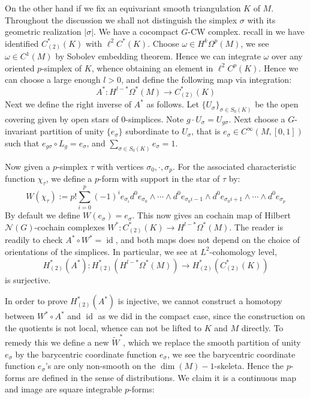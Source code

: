 \documentclass[11pt]{report}
\theoremstyle{definition}
\theoremstyle{plain}
\DeclareMathOperator{\id}{id}
\newcommand{\vna}{\mathcal{N}}
\renewcommand{\tilde}{\widetilde}
\begin{document}
On the other hand if we fix an equivariant smooth triangulation $K$ of $M$. Throughout the discussion we shall not distinguish the simplex $\sigma$ with its geometric realization $|\sigma|$. We have a cocompact $G$-CW complex. recall in  we have identified $C^*_{(2)}(K)$ with $\ell^2C^*(K)$. Choose $\omega\in H^k\Omega^p(M)$, we see $\omega\in C^1(M)$ by Sobolev embedding theorem. Hence we can integrate $\omega$ over any oriented $p$-simplex of $K$, whence obtaining an element in $\ell^2C^p(K)$. Hence we can choose a large enough $l>0$, and define the following map via integration:
\begin{equation}
A^*:H^{l-*}\Omega^*(M)\to C^*_{(2)}(K)
\end{equation}
Next we define the right inverse of $A^*$ as follows. Let $\{U_\sigma\}_{\sigma\in S_0(K)}$ be the open covering given by open stars of $0$-simplices. Note $g\cdot U_\sigma=U_{g\sigma}$. Next choose a $G$-invariant partition of unity $\{e_\sigma\}$ subordinate to $U_\sigma$, that is $e_\sigma\in C^\infty(M, [0,1])$ such that $e_{g\sigma}\circ L_g=e_\sigma$, and $\sum_{\sigma\in S_0(K)}^{}e_\sigma=1$. 
\par Now given a $p$-simplex $\tau$ with vertices $\sigma_0, \cdot,\sigma_p$. For the associated characteristic function $\chi_{\tau}$, we define a $p$-form with support in the star of $\tau$ by:
\begin{equation*}
W(\chi_{\tau}):=p!\sum_{i=0}^{p}(-1)^ie_{\sigma_i}d^0e_{\sigma_0}\wedge \cdots \wedge d^0e_{\sigma_0{i-1}}\wedge d^0e_{\sigma_0{i+1}}\wedge \cdots \wedge d^0e_{\sigma_p}
\end{equation*}
By default we define $W(e_{\sigma})=e_{\sigma}$. This now gives an cochain map of Hilbert $\vna(G)$-cochain complexes $W^*:C^*_{(2)}(K)\to H^{l-*}\Omega^*(M)$. The reader is readily to check $A^*\circ W^*=\id$, and both maps does not depend on the choice of orientations of the simplices. In particular, we see at $L^2$-cohomology level,
\begin{equation*}
H^*_{(2)}(A^*):H^*_{(2)}(H^{l-*}\Omega^*(M))\to H^*_{(2)}(C^*_{(2)}(K))
\end{equation*}
is surjective. 
\par In order to prove $H^*_{(2)}(A^*)$ is injective, we cannot construct a homotopy between $W^*\circ A^*$ and $\id$ as we did in the compact case, since the construction on the quotients is not local, whence can not be lifted to $K$ and $M$ directly. To remedy this we define a new $\tilde{W}^*$, which we replace the smooth partition of unity $e_\sigma$ by the barycentric coordinate function $e_\sigma$, we see the barycentric coordinate function $e_\sigma$'s are only non-smooth on the $\dim(M)-1$-skeleta. Hence the $p$-forms are defined in the sense of distributions. We claim it is a continuous map and image are square integrable $p$-forms:
\end{document}

